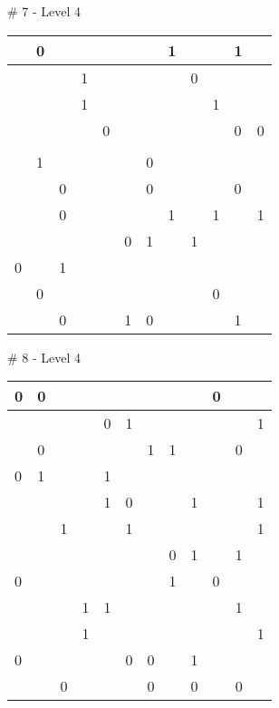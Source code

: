 \medskip

\# 7 - Level 4 \newline
\begin{tabular}{|m{\collen}|m{\collen}|m{\collen}|m{\collen}|m{\collen}|m{\collen}|m{\collen}|m{\collen}|m{\collen}|m{\collen}|m{\collen}|m{\collen}|}
\hline
    & 0 &   &   &   &   &   & 1 &   &   & 1 &   \\
\hline
    &   &   & 1 &   &   &   &   & 0 &   &   &   \\
\hline
    &   &   & 1 &   &   &   &   &   & 1 &   &   \\
\hline
    &   &   &   & 0 &   &   &   &   &   & 0 & 0 \\
\hline
    &   &   &   &   &   &   &   &   &   &   &   \\
\hline
    & 1 &   &   &   &   & 0 &   &   &   &   &   \\
\hline
    &   & 0 &   &   &   & 0 &   &   &   & 0 &   \\
\hline
    &   & 0 &   &   &   &   & 1 &   & 1 &   & 1 \\
\hline
    &   &   &   &   & 0 & 1 &   & 1 &   &   &   \\
\hline
  0 &   & 1 &   &   &   &   &   &   &   &   &   \\
\hline
    & 0 &   &   &   &   &   &   &   & 0 &   &   \\
\hline
    &   & 0 &   &   & 1 & 0 &   &   &   & 1 &   \\
\hline
\end{tabular}


\medskip

\# 8 - Level 4 \newline
\begin{tabular}{|m{\collen}|m{\collen}|m{\collen}|m{\collen}|m{\collen}|m{\collen}|m{\collen}|m{\collen}|m{\collen}|m{\collen}|m{\collen}|m{\collen}|}
\hline
  0 & 0 &   &   &   &   &   &   &   & 0 &   &   \\
\hline
    &   &   &   & 0 & 1 &   &   &   &   &   & 1 \\
\hline
    & 0 &   &   &   &   & 1 & 1 &   &   & 0 &   \\
\hline
  0 & 1 &   &   & 1 &   &   &   &   &   &   &   \\
\hline
    &   &   &   & 1 & 0 &   &   & 1 &   &   & 1 \\
\hline
    &   & 1 &   &   & 1 &   &   &   &   &   & 1 \\
\hline
    &   &   &   &   &   &   & 0 & 1 &   & 1 &   \\
\hline
  0 &   &   &   &   &   &   & 1 &   & 0 &   &   \\
\hline
    &   &   & 1 & 1 &   &   &   &   &   & 1 &   \\
\hline
    &   &   & 1 &   &   &   &   &   &   &   & 1 \\
\hline
  0 &   &   &   &   & 0 & 0 &   & 1 &   &   &   \\
\hline
    &   & 0 &   &   &   & 0 &   & 0 &   & 0 &   \\
\hline
\end{tabular}


